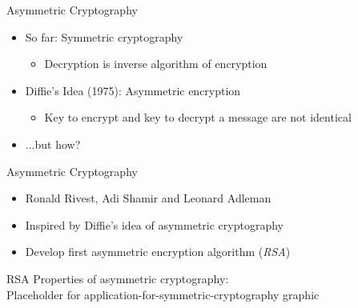 \documentclass[handout]{beamer}
\begin{document}
\begin{frame}{Asymmetric Cryptography}
	\begin{itemize}
		\item<1-> So far: Symmetric cryptography
		\begin{itemize}
			\item<1->Decryption is inverse algorithm of encryption
		\end{itemize}
		\item<2-> Diffie's Idea (1975): Asymmetric encryption
		\begin{itemize}
			\item<2->Key to encrypt and key to decrypt a message are not identical
		\end{itemize}
		\item<3->...but how?
	\end{itemize}
\end{frame}

\begin{frame}{Asymmetric Cryptography}
	\begin{itemize}
		\item<1-> Ronald Rivest, Adi Shamir and Leonard Adleman
		\item<2-> Inspired by Diffie's idea of asymmetric cryptography
		\item<3-> Develop first asymmetric encryption algorithm (\textit{RSA}) \cite{rivest1978}
	\end{itemize}
\end{frame}

\begin{frame}{RSA}
	Properties of asymmetric cryptography:\\
	\huge{Placeholder for application-for-symmetric-cryptography graphic}
%		
\end{frame}
\end{document}
